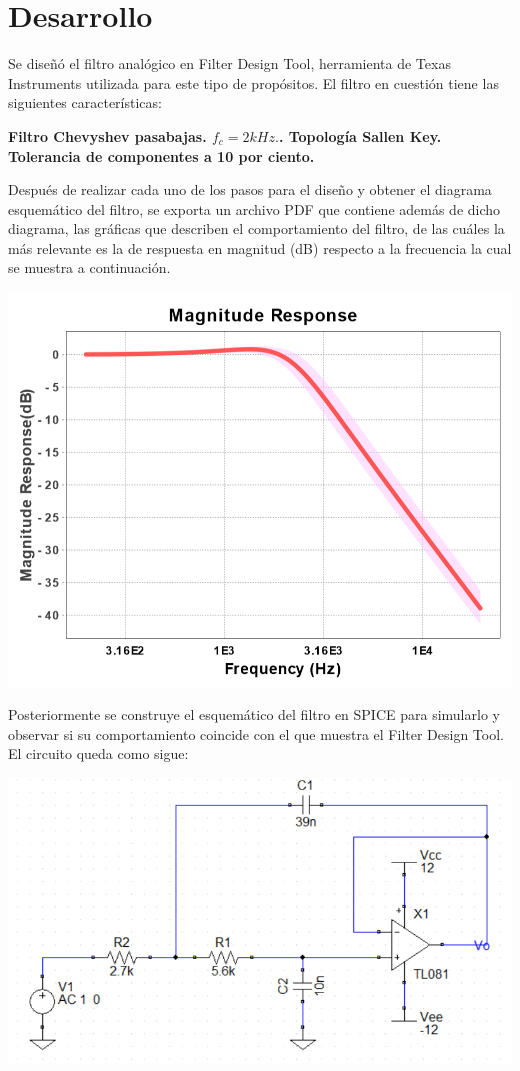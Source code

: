 \documentclass[12pt]{article}
\begin{document}
\section{Desarrollo}
Se diseñó el filtro analógico en Filter Design Tool, herramienta de Texas Instruments utilizada para este tipo de propósitos. El filtro en cuestión tiene las siguientes características:
\begin{center}
\textbf{Filtro Chevyshev pasabajas. $f_{c} = 2kHz.$. Topología Sallen Key. Tolerancia de componentes a 10 por ciento.}
\end{center}
Después de realizar cada uno de los pasos para el diseño y obtener el diagrama esquemático del filtro, se exporta un archivo PDF que contiene además de dicho diagrama, las gráficas que describen el comportamiento del filtro, de las cuáles la más relevante es la de respuesta en magnitud (dB) respecto a la frecuencia la cual se muestra a continuación.
\begin{center}
    \centering
    \includegraphics[scale=0.6]{dB_response_FDT.png}
\end{center}
Posteriormente se construye el esquemático del filtro en SPICE para simularlo y observar si su comportamiento coincide con el que muestra el Filter Design Tool. El circuito queda como sigue:
\begin{center}
    \centering
    \includegraphics[scale=0.6]{Diagrama_LPF.png}
\end{center}
\end{document}
